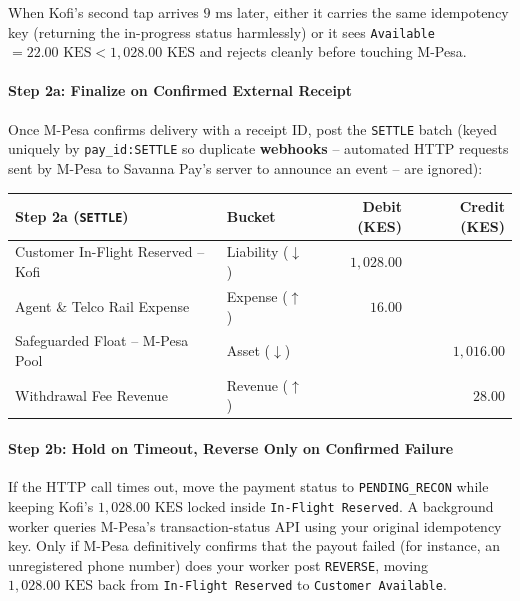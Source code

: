 When Kofi's second tap arrives $9\text{ ms}$ later, either it carries the same idempotency key (returning the in-progress status harmlessly) or it sees \texttt{Available} $= 22.00\text{ KES} < 1{,}028.00\text{ KES}$ and rejects cleanly before touching M-Pesa.

\paragraph{Step 2a: Finalize on Confirmed External Receipt}
Once M-Pesa confirms delivery with a receipt ID, post the \texttt{SETTLE} batch (keyed uniquely by \texttt{pay\_id:SETTLE} so duplicate \textbf{webhooks} -- automated HTTP requests sent by M-Pesa to Savanna Pay's server to announce an event -- are ignored):

\begin{center}
\small
\begin{tabular}{llrr}
\toprule
\textbf{Step 2a (\texttt{SETTLE})} & \textbf{Bucket} & \textbf{Debit (KES)} & \textbf{Credit (KES)} \\
\midrule
Customer In-Flight Reserved -- Kofi & Liability ($\downarrow$) & $1{,}028.00$ & \\
Agent \& Telco Rail Expense & Expense ($\uparrow$) & $16.00$ & \\
Safeguarded Float -- M-Pesa Pool & Asset ($\downarrow$) & & $1{,}016.00$ \\
Withdrawal Fee Revenue & Revenue ($\uparrow$) & & $28.00$ \\
\bottomrule
\end{tabular}
\end{center}

\paragraph{Step 2b: Hold on Timeout, Reverse Only on Confirmed Failure}
If the HTTP call times out, move the payment status to \texttt{PENDING\_RECON} while keeping Kofi's $1{,}028.00\text{ KES}$ locked inside \texttt{In-Flight Reserved}. A background worker queries M-Pesa's transaction-status API using your original idempotency key. Only if M-Pesa definitively confirms that the payout failed (for instance, an unregistered phone number) does your worker post \texttt{REVERSE}, moving $1{,}028.00\text{ KES}$ back from \texttt{In-Flight Reserved} to \texttt{Customer Available}.

